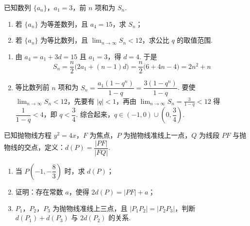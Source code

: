 \begin{problem}
已知数列 \(\{a_n\}\)，\(a_1=3\)，前 \(n\) 项和为 \(S_n\).

\begin{enumerate}
\item 若 \(\{a_n\}\) 为等差数列，且 \(a_4=15\)，求 \(S_n\)；
\item 若 \(\{a_n\}\) 为等比数列，且 \(\displaystyle\lim_{n\to\infty}S_n<12\)，求公比 \(q\) 的取值范围.
\end{enumerate}
\end{problem}

\begin{solution}
\begin{enumerate}
\item 由 \(a_4=a_1+3d=15\) 且 \(a_1=3\)，得 \(d=4\). 于是
\[
S_n=\frac n2\bigl(2a_1+(n-1)d\bigr)
=\frac n2\bigl(6+4n-4\bigr)
=2n^2+n
\]

\item 等比数列前 \(n\) 项和为 \(S_n=\dfrac{a_1(1-q^n)}{1-q}=\dfrac{3(1-q^n)}{1-q}\). 要使 \(\displaystyle\lim_{n\to\infty}S_n<12\)，先要有 \(|q|<1\)，再由
\(\displaystyle\lim_{n\to\infty}S_n=\frac3{1-q}<12\)
得 \(\dfrac1{1-q}<4\)，即 \(q<\dfrac34\). 综合起来，\(q\in(-1,0)\cup\left(0,\dfrac34\right)\).
\end{enumerate}
\end{solution}

\begin{problem}
已知抛物线方程 \(y^2=4x\)，\(F\) 为焦点，\(P\) 为抛物线准线上一点，\(Q\) 为线段 \(PF\) 与抛物线的交点，定义：\(d(P)=\dfrac{|PF|}{|FQ|}\).

\begin{enumerate}
\item 当 \(P\left(-1,-\dfrac83\right)\) 时，求 \(d(P)\)；
\item 证明：存在常数 \(a\)，使得 \(2d(P)=|PF|+a\)；
\item \(P_1\)，\(P_2\)，\(P_3\) 为抛物线准线上三点，且 \(|P_1P_2|=|P_2P_3|\)，判断 \(d(P_1)+d(P_3)\) 与 \(2d(P_2)\) 的关系.
\end{enumerate}
\end{problem}

